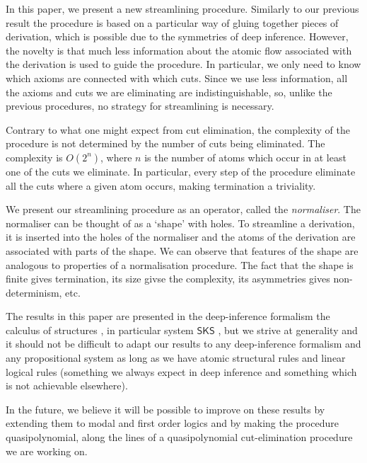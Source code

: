 \documentclass[a4paper]{llncs}
\begin{document}
In this paper, we present a new streamlining procedure. Similarly to our previous result the procedure is based on a particular way of gluing together pieces of derivation, which is possible due to the symmetries of deep inference. However, the novelty is that much less information about the atomic flow associated with the derivation is used to guide the procedure. In particular, we only need to know which axioms are connected with which cuts. Since we use less information, all the axioms and cuts we are eliminating are indistinguishable, so, unlike the previous procedures, no strategy for streamlining is necessary.

Contrary to what one might expect from cut elimination, the complexity of the procedure is not determined by the number of cuts being eliminated. The complexity is $O(2^n)$, where $n$ is the number of atoms which occur in at least one of the cuts we eliminate. In particular, every step of the procedure eliminate all the cuts where a given atom occurs, making termination a triviality.

We present our streamlining procedure as an operator, called the \emph{normaliser}. The normaliser can be thought of as a `shape' with holes. To streamline a derivation, it is inserted into the holes of the normaliser and the atoms of the derivation are associated with parts of the shape. We can observe that features of the shape are analogous to properties of a normalisation procedure. The fact that the shape is finite gives termination, its size givse the complexity, its asymmetries gives non-determinism, etc.

\newcommand{\SKS}{\mathsf{SKS}}
The results in this paper are presented in the deep-inference formalism the calculus of structures \cite{Gugl:06:A-System:kl}, in particular system $\SKS$ \cite{BrunTiu:01:A-Local-:mz,Brun:04:Deep-Inf:rq}, but we strive at generality and it should not be difficult to adapt our results to any deep-inference formalism and any propositional system as long as we have atomic structural rules and linear logical rules (something we always expect in deep inference and something which is not achievable elsewhere).

In the future, we believe it will be possible to improve on these results by extending them to modal \cite{Brun:07:Deep-Seq:fk,HeinStew:05:Purity-T:tg,StewStou:05:A-System:tg,Stou:06:A-Deep-I:rt} and first order \cite{Brun:04:Deep-Inf:rq,Brun:06:Cut-Elim:cq} logics and by making the procedure quasipolynomial, along the lines of a quasipolynomial cut-elimination procedure we are working on.
\end{document}
